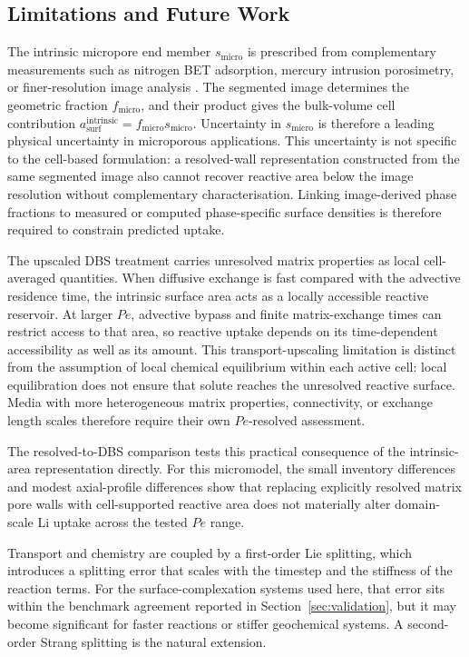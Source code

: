 \subsection{Limitations and Future Work}

The intrinsic micropore end member $s_{\mathrm{micro}}$ is prescribed from
complementary measurements such as nitrogen BET adsorption, mercury intrusion
porosimetry, or finer-resolution image analysis \citep{noiriel2009changes}.
The segmented image determines the geometric fraction $f_{\mathrm{micro}}$,
and their product gives the bulk-volume cell contribution
$a_{\mathrm{surf}}^{\mathrm{intrinsic}}=f_{\mathrm{micro}}s_{\mathrm{micro}}$.
Uncertainty in $s_{\mathrm{micro}}$ is therefore a leading physical uncertainty
in microporous applications. This uncertainty is not specific to the
cell-based formulation: a resolved-wall representation constructed from the
same segmented image also cannot recover reactive area below the image
resolution without complementary characterisation. Linking image-derived
phase fractions to measured or computed phase-specific surface densities is
therefore required to constrain predicted uptake.

The upscaled DBS treatment carries unresolved matrix properties as local
cell-averaged quantities. When diffusive exchange is fast compared with the
advective residence time, the intrinsic surface area acts as a locally
accessible reactive reservoir. At larger $Pe$, advective bypass and finite
matrix-exchange times can restrict access to that area, so reactive uptake
depends on its time-dependent accessibility as well as its amount. This
transport-upscaling limitation is distinct from the assumption of local
chemical equilibrium within each active cell: local equilibration does not
ensure that solute reaches the unresolved reactive surface. Media with more
heterogeneous matrix properties, connectivity, or exchange length scales
therefore require their own $Pe$-resolved assessment.

The resolved-to-DBS comparison tests this practical consequence of the
intrinsic-area representation directly. For this micromodel, the small
inventory differences and modest axial-profile differences show that replacing
explicitly resolved matrix pore walls with cell-supported reactive area does
not materially alter domain-scale Li uptake across the tested $Pe$ range.

Transport and chemistry are coupled by a first-order Lie splitting, which
introduces a splitting error that scales with the timestep and the stiffness of
the reaction terms. For the surface-complexation systems used here, that error
sits within the benchmark agreement reported in Section~\ref{sec:validation},
but it may become significant for faster reactions or stiffer geochemical
systems. A second-order Strang splitting \citep{strang1968construction} is the
natural extension.

